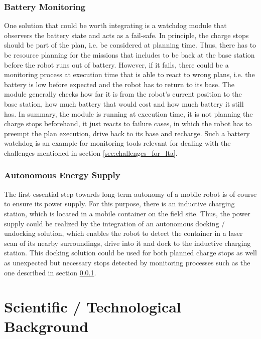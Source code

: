 \documentclass[english, master, expose, utf8]{base/thesis_KBS}
\begin{document}
\subsubsection{Battery Monitoring}
\label{sec:battery_monitoring}

One solution that could be worth integrating is a watchdog module that observers the battery state and acts as a fail-safe. In principle, the charge stops should
be part of the plan, i.e. be considered at planning time. Thus, there has to be resource planning for the missions that includes to be back at the base station before
the robot runs out of battery. However, if it fails, there could be a monitoring process at execution time that is able to react to wrong plans, i.e. the battery is
low before expected and the robot has to return to its base. The module generally checks how far it is from the robot's current position to the base station, how much
battery that would cost and how much battery it still has. In summary, the module is running at execution time, it is not planning the charge stops beforehand,
it just reacts to failure cases, in which the robot has to preempt the plan execution, drive back to its base and recharge.
Such a battery watchdog is an example for monitoring tools relevant for dealing with the challenges mentioned in section \ref{sec:challenges_for_lta}.

\subsubsection{Autonomous Energy Supply}

The first essential step towards long-term autonomy of a mobile robot is of course to ensure its power supply.
For this purpose, there is an inductive charging station, which is located in a mobile container on the field site.
Thus, the power supply could be realized by the integration of an autonomous docking / undocking solution, which enables the robot to detect
the container in a laser scan of its nearby surroundings, drive into it and dock to the inductive charging station.
This docking solution could be used for both planned charge stops as well as unexpected but necessary stops detected by monitoring processes such
as the one described in section \ref{sec:battery_monitoring}.

\section{Scientific / Technological Background}
\label{sec:scientific_bg}
\end{document}
